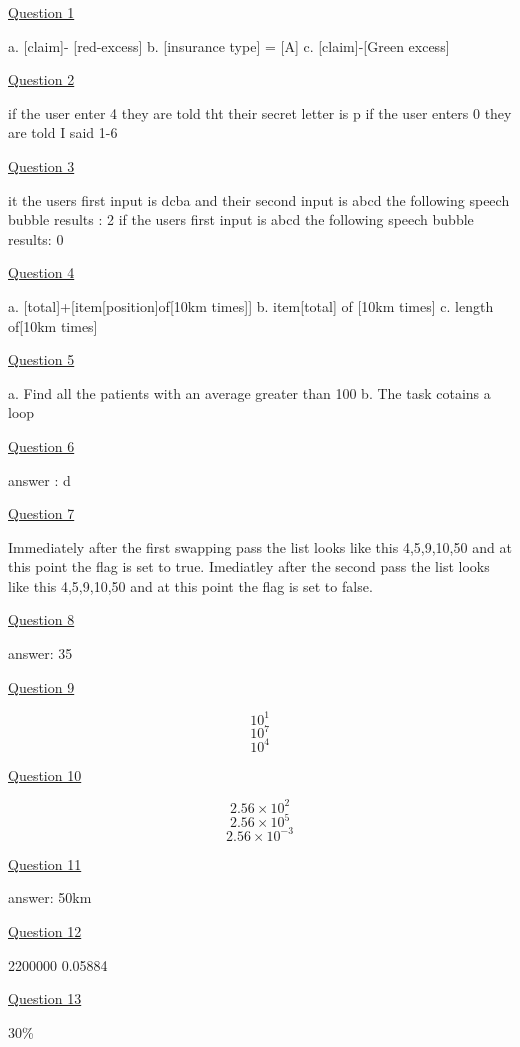 \documentclass{article}
\begin{document}
\underline{Question 1}

a. [claim]- [red-excess]
b. [insurance type] = [A]
c. [claim]-[Green excess]

\underline{Question 2}

if the user enter 4 they are told tht their secret letter is p
if the user enters 0 they are told I said 1-6

\underline{Question 3}

it the users first input is dcba and their second input is abcd the following speech bubble results : 2
if the users first input is abcd the following speech bubble results: 0

\underline{Question 4}

a. [total]+[item[position]of[10km times]]
b. item[total] of [10km times]
c. length of[10km times]

\underline{Question 5}

a. Find all the patients with an average greater than 100
b. The task cotains a loop

\underline{Question 6}

answer  : d

\underline{Question 7}

Immediately after the first swapping pass the list looks like this 4,5,9,10,50 and at this point the flag is set to true.
Imediatley after the second pass the list looks like this 4,5,9,10,50 and at this point the flag is set to false.

\underline{Question 8}

answer: 35

\underline{Question 9}

\[10^1\]
\[10^7\]
\[10^4\]

\underline{Question 10}

\[2.56 \times 10^2\]
\[2.56 \times 10^5\]
\[2.56 \times 10^{-3}\]

\underline{Question 11}

answer: 50km

\underline{Question 12}

2200000
0.05884

\underline{Question 13}

30\%
\end{document}
